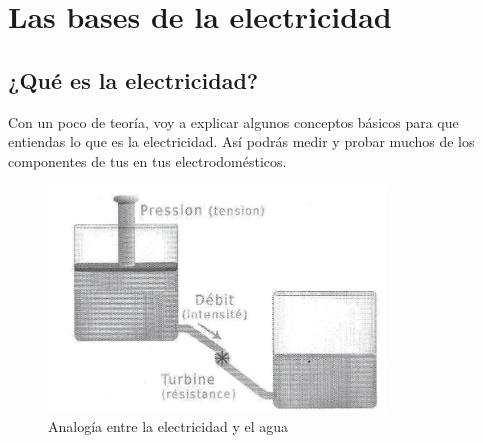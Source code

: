 \documentclass[a5paper,twoside,openany]{book}
\begin{document}
\chapter{Las bases de la electricidad}
\section{¿Qué es la electricidad?}
Con un poco de teoría, voy a explicar algunos conceptos básicos
para que entiendas lo que es la electricidad.
Así podrás medir y probar muchos de los componentes de tus
en tus electrodomésticos.

\begin{figure}[h]
\includegraphics[width=0.8\textwidth]{analogia-agua-elec} %
\caption*{Analogía entre la electricidad y el agua}
\end{figure}
\end{document}
